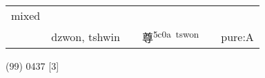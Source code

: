 \documentclass[14pt,a4paper]{scrartcl}
\begin{document}
\begin{longtable}[c]{@{}llllll@{}}
\begin{minipage}[t]{0.14\columnwidth}
mixed
\strut\end{minipage}\tabularnewline
\begin{minipage}[t]{0.14\columnwidth}\raggedright\strut
𢍜
\strut\end{minipage} &
\begin{minipage}[t]{0.14\columnwidth}\raggedright\strut
dzwon, tshwin
\strut\end{minipage} &
\begin{minipage}[t]{0.14\columnwidth}\raggedright\strut
\strut\end{minipage} &
\begin{minipage}[t]{0.14\columnwidth}\raggedright\strut
尊\textsuperscript{5c0a~tswon}
\strut\end{minipage} &
\begin{minipage}[t]{0.14\columnwidth}\raggedright\strut
\strut\end{minipage} &
\begin{minipage}[t]{0.14\columnwidth}\raggedright\strut
pure:A
\strut\end{minipage}\tabularnewline
\bottomrule
\end{longtable}

(99) 0437 {[}3{]}
\end{document}
